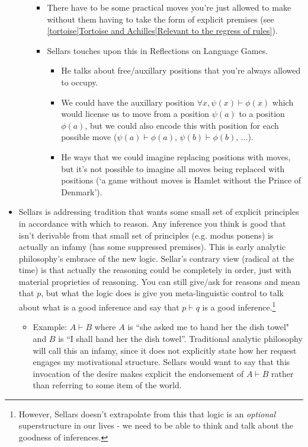 \begin{itemize}
\begin{itemize}
        \begin{itemize}
        \item There have to be some practical moves you're just allowed to make without them having to take the form of explicit premises (see \ref{tortoise|Tortoise and Achilles|Relevant to the regress of rules}).
        \item Sellars touches upon this in Reflections on Language Games.
            \begin{itemize}
            \item He talks about free/auxillary positions that you're always allowed to occupy.
            \item  We could have the auxillary position $\forall x, \psi(x)\vdash \phi(x)$ which would license us to move from a position $\psi(a)$ to a position $\phi(a)$, but we could also encode this with position for each possible move ($\psi(a)\vdash \phi(a)$, $\psi(b)\vdash\phi(b)$, ...).
            \item He ways that we could imagine replacing positions with moves, but it's not possible to imagine all moves being replaced with positions (`a game without moves is Hamlet without the Prince of Denmark').
            \end{itemize}
        \end{itemize}
    \end{itemize}
    \item Sellars is addressing tradition that wants some small set of explicit principles in accordance with which to reason. Any inference you think is good that isn't derivable from that small set of principles (e.g. modus ponens) is actually an infamy (has some suppressed premises). This is early analytic philosophy's embrace of the new logic. Sellar's contrary view (radical at the time) is that actually the reasoning could be completely in order, just with material proprieties of reasoning. You can still give/ask for reasons and mean that $p$, but what the logic does is give you meta-linguistic control to talk about what is a good inference and say that $p \vdash q$ is a good inference.\footnote{However, Sellars doesn't extrapolate from this that logic is an \emph{optional} superstructure in our lives - we need to be able to think and talk about the goodness of inferences.} \begin{itemize}
    \item Example: $A\vdash B$ where $A$ is ``she asked me to hand her the dish towel" and $B$ is ``I shall hand her the dish towel''. Traditional analytic philosophy will call this an infamy, since it does not explicitly state how her request engages my motivational structure. Sellars would want to say that this invocation of the desire makes explicit the endorsement of $A \vdash B$ rather than referring to some item of the world.


\end{itemize}
\end{itemize}
